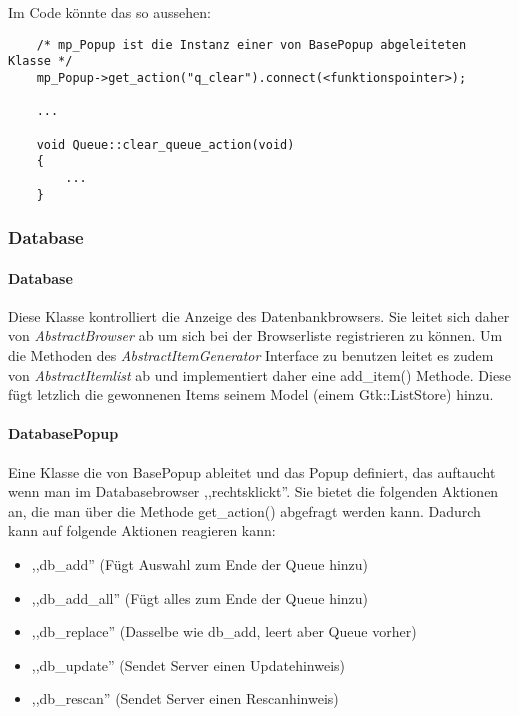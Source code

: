 Im Code könnte das so aussehen:
\begin{verbatim}
    /* mp_Popup ist die Instanz einer von BasePopup abgeleiteten Klasse */
    mp_Popup->get_action("q_clear").connect(<funktionspointer>);

    ...

    void Queue::clear_queue_action(void)
    {
        ...
    }
\end{verbatim}


\subsubsection{Database}
\paragraph{Database}
Diese Klasse kontrolliert die Anzeige des Datenbankbrowsers. Sie leitet sich daher von \emph{AbstractBrowser} ab um sich bei der Browserliste registrieren zu können.
Um die Methoden des \emph{AbstractItemGenerator} Interface zu benutzen leitet es zudem von \emph{AbstractItemlist} ab und implementiert daher eine add\_item() Methode. 
Diese fügt letzlich die gewonnenen Items seinem Model (einem Gtk::ListStore) hinzu.

\paragraph{DatabasePopup}
Eine Klasse die von BasePopup ableitet und das Popup definiert, das auftaucht wenn man im Databasebrowser ,,rechtsklickt''.
Sie bietet die folgenden Aktionen an, die man über die Methode get\_action() abgefragt werden kann.
Dadurch kann auf folgende Aktionen reagieren kann:
\begin{itemize}
\item ,,db\_add'' (Fügt Auswahl zum Ende der Queue hinzu)
\item ,,db\_add\_all'' (Fügt alles zum Ende der Queue hinzu)
\item ,,db\_replace'' (Dasselbe wie db\_add, leert aber Queue vorher)
\item ,,db\_update'' (Sendet Server einen Updatehinweis)
\item ,,db\_rescan'' (Sendet Server einen Rescanhinweis)
\end{itemize}

